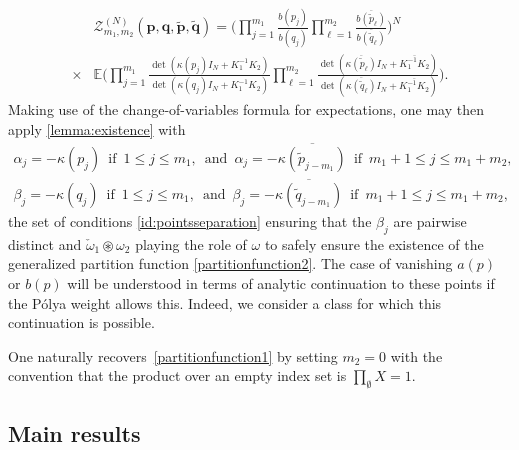 \documentclass[pdflatex,sn-mathphys-num]{sn-jnl}
\theoremstyle{thmstyleone}
\numberwithin{equation}{section}
\begin{document}
\begin{equation}\label{partitionfunction3}
\begin{split}
    &\mathscr{Z}^{\left(N\right)}_{m_{1},m_{2}}\left(\textbf{p},\textbf{q},\widetilde{\textbf{p}},\widetilde{\textbf{q}}\right)=\Bigg( \prod\limits_{j=1}^{m_{1}}\frac{b\left ( p_{j} \right )}{b\left ( q_{j} \right )}\prod\limits_{\ell=1}^{m_{2}}\frac{\overline{b\left ( \widetilde{p}_{\ell} \right )}}{\overline{b\left ( \widetilde{q}_{\ell} \right )}} \Bigg)^{N} 
    \\
    \times&\mathbb{E}\Bigg(\prod_{j=1}^{m_{1}}\frac{\det\left ( \kappa\left ( p_{j} \right )I_{N}+K_{1}^{-1}K_{2} \right )}{\det\left ( \kappa\left ( q_{j} \right )I_{N}+K_{1}^{-1}K_{2} \right )}\prod_{\ell=1}^{m_{2}}\frac{\det\left ( \overline{\kappa\left ( \widetilde{p}_{\ell} \right )}I_{N}+\overline{K_{1}^{-1}K_{2}  } \right )}{\det\left ( \overline{\kappa\left ( \widetilde{q}_{\ell} \right )}I_{N}+\overline{K_{1}^{-1}K_{2}} \right )}\Bigg).
\end{split}
\end{equation}
Making use of the change-of-variables formula for expectations, one may then apply \autoref{lemma:existence} with 
\begin{align*}
    \alpha_{j}=-\kappa(p_{j})\,\text{ if }\,1\leq j\leq m_{1},\,\text{ and }\,\alpha_{j}=-\overline{\kappa(\widetilde{p}_{j-m_{1}})}\,\text{ if }\,m_{1}+1\leq j\leq m_{1}+m_{2},
    \\
    \beta_{j}=-\kappa(q_{j})\,\text{ if }\,1\leq j\leq m_{1},\,\text{ and }\,\beta_{j}=-\overline{\kappa(\widetilde{q}_{j-m_{1}})}\,\text{ if }\,m_{1}+1\leq j\leq m_{1}+m_{2},
\end{align*}
the set of conditions \eqref{id:pointsseparation} ensuring that the $\beta_{j}$ are pairwise distinct and $\check{\omega}_{1}\circledast\omega_{2}$ playing the role of $\omega$ to safely ensure the existence of the generalized partition function \eqref{partitionfunction2}. The case of vanishing $a(p)$ or $b(p)$ will be understood in terms of analytic continuation to these points if the P\'olya weight allows this. Indeed, we consider a class for which this continuation is possible.

One naturally recovers~\eqref{partitionfunction1} by setting $m_{2}=0$ with the convention that the product over an empty index set is $\prod_{\emptyset}X=1$.

\subsection{Main results}\label{sec:main-results}
\end{document}
